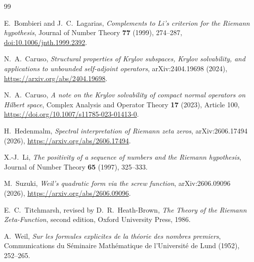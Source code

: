 \documentclass[11pt]{article}
\theoremstyle{definition}
\theoremstyle{remark}
\begin{document}
\begin{thebibliography}{99}

E.~Bombieri and J.~C.~Lagarias,
\emph{Complements to Li's criterion for the Riemann hypothesis},
Journal of Number Theory \textbf{77} (1999), 274--287,
\href{https://doi.org/10.1006/jnth.1999.2392}{doi:10.1006/jnth.1999.2392}.

N.~A.~Caruso,
\emph{Structural properties of Krylov subspaces, Krylov solvability, and applications to
unbounded self-adjoint operators},
arXiv:2404.19698 (2024),
\url{https://arxiv.org/abs/2404.19698}.

N.~A.~Caruso,
\emph{A note on the Krylov solvability of compact normal operators on Hilbert space},
Complex Analysis and Operator Theory \textbf{17} (2023), Article 100,
\url{https://doi.org/10.1007/s11785-023-01413-0}.

H.~Hedenmalm,
\emph{Spectral interpretation of Riemann zeta zeros},
arXiv:2606.17494 (2026),
\url{https://arxiv.org/abs/2606.17494}.

X.-J.~Li,
\emph{The positivity of a sequence of numbers and the Riemann hypothesis},
Journal of Number Theory \textbf{65} (1997), 325--333.

M.~Suzuki,
\emph{Weil's quadratic form via the screw function},
arXiv:2606.09096 (2026),
\url{https://arxiv.org/abs/2606.09096}.

E.~C.~Titchmarsh, revised by D.~R.~Heath-Brown,
\emph{The Theory of the Riemann Zeta-Function}, second edition,
Oxford University Press, 1986.

A.~Weil,
\emph{Sur les formules explicites de la th\'eorie des nombres premiers},
Communications du S\'eminaire Math\'ematique de l'Universit\'e de Lund (1952), 252--265.

\end{thebibliography}
\end{document}
